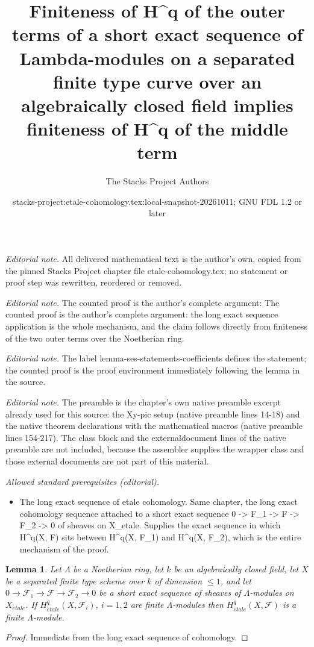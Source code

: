 \documentclass[10pt,a4paper]{amsart}
\title{Finiteness of H\textasciicircum{}q of the outer terms of a short exact sequence of Lambda-modules on a separated finite type curve over an algebraically closed field implies finiteness of H\textasciicircum{}q of the middle term}
\author{The Stacks Project Authors}
\date{stacks-project:etale-cohomology.tex:local-snapshot-20261011; GNU FDL 1.2 or later}
\theoremstyle{plain}
\newtheorem{lemma}[subsection]{Lemma}
\theoremstyle{definition}
\theoremstyle{remark}
\numberwithin{equation}{subsection}
\def\etale{{\acute{e}tale}}
\begin{document}
\maketitle
\noindent\textit{Editorial note.} All delivered mathematical text is the author's own, copied from the pinned Stacks Project chapter file etale-cohomology.tex; no statement or proof step was rewritten, reordered or removed.\par\medskip
\noindent\textit{Editorial note.} The counted proof is the author's complete argument: The counted proof is the author's complete argument: the long exact sequence application is the whole mechanism, and the claim follows directly from finiteness of the two outer terms over the Noetherian ring.\par\medskip
\noindent\textit{Editorial note.} The label lemma-ses-statements-coefficients defines the statement; the counted proof is the proof environment immediately following the lemma in the source.\par\medskip
\noindent\textit{Editorial note.} The preamble is the chapter's own native preamble excerpt already used for this source: the Xy-pic setup (native preamble lines 14-18) and the native theorem declarations with the mathematical macros (native preamble lines 154-217). The class block and the externaldocument lines of the native preamble are not included, because the assembler supplies the wrapper class and those external documents are not part of this material.\par\medskip
\noindent\textit{Allowed standard prerequisites (editorial).}\begin{itemize}
\item The long exact sequence of etale cohomology. Same chapter, the long exact cohomology sequence attached to a short exact sequence 0 -> F\_1 -> F -> F\_2 -> 0 of sheaves on X\_etale. Supplies the exact sequence in which H\textasciicircum{}q(X, F) sits between H\textasciicircum{}q(X, F\_1) and H\textasciicircum{}q(X, F\_2), which is the entire mechanism of the proof.
\end{itemize}\medskip
\begin{lemma}
\label{lemma-ses-statements-coefficients}
Let $\Lambda$ be a Noetherian ring, let $k$ be an algebraically closed field,
let $X$ be a separated finite type scheme over $k$ of dimension $\leq 1$, and
let $0 \to \mathcal{F}_1 \to \mathcal{F} \to \mathcal{F}_2 \to 0$
be a short exact sequence of sheaves of $\Lambda$-modules on $X_\etale$. If
$H^q_\etale(X, \mathcal{F}_i)$, $i = 1, 2$ are finite $\Lambda$-modules
then $H^q_\etale(X, \mathcal{F})$ is a finite $\Lambda$-module.
\end{lemma}

\begin{proof}
Immediate from the long exact sequence of cohomology.
\end{proof}
\end{document}
